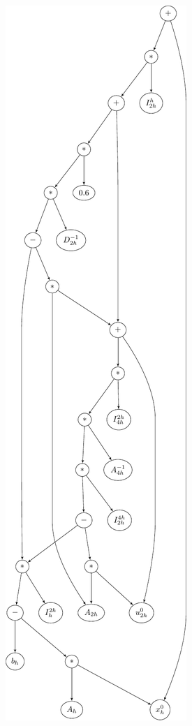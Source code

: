 \begin{figure}
	\centering
	\begin{subfigure}{0.49\textwidth}
		\includegraphics[scale=0.5]{figures/trees/three_grid_method_computational_graph.pdf}

\end{subfigure}
\end{figure}
